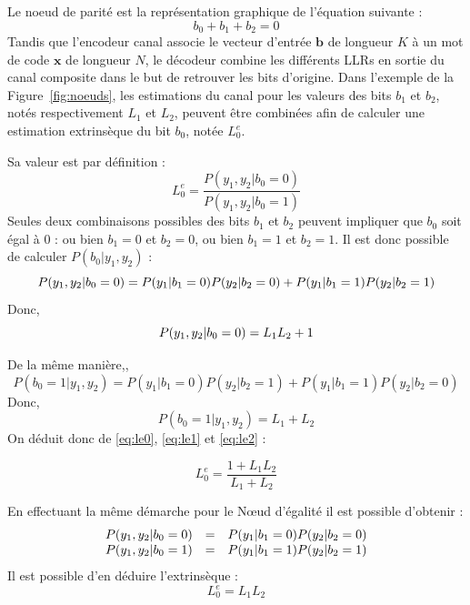 Le noeud de parité est la représentation graphique de l'équation suivante : 
\begin{equation}
b_0 + b_1 + b_2 = 0
\end{equation}
Tandis que l'encodeur canal associe le vecteur d'entrée $\mathbold{b}$ de longueur $K$ à un mot de code $\mathbold{x}$ de longueur $N$, le décodeur combine les différents LLRs en sortie du canal composite dans le but de retrouver les bits d'origine.
Dans l'exemple de la Figure~\ref{fig:noeuds}, les estimations du canal pour les valeurs des bits $b_1$ et $b_2$, notés respectivement $L_1$ et $L_2$, peuvent être combinées afin de calculer une estimation extrinsèque du bit $b_0$, notée $L_0^e$.

Sa valeur est par définition :
\begin{equation}
L^e_0 = \dfrac{P(y_1,y_2 | b_0 = 0)}{P(y_1,y_2 | b_0 = 1)}
\label{eq:le0}
\end{equation}
Seules deux combinaisons possibles des bits $b_1$ et $b_2$ peuvent impliquer que $b_0$ soit égal à $0$ : ou bien $b_1=0$ et $b_2=0$, ou bien $b_1=1$ et $b_2=1$. Il est donc possible de calculer $P(b_0|y_1,y_2)$ : 
\begin{equation}
P(y_1,y_2 | b_0 = 0)  =  P(y_1 | b_1 = 0)P(y_2 | b_2 = 0) + P(y_1 | b_1 = 1)P(y_2 | b_2 = 1) \\
\end{equation}
Donc,  
\begin{equation}
P(y_1,y_2 | b_0 = 0)  =  L_1L_2 + 1 \\
\label{eq:le1}
\end{equation}


De la même manière,,
\begin{equation}
P(b_0 = 1 | y_1,y_2) =P(y_1 | b_1 = 0)P(y_2 | b_2 = 1) + P(y_1 | b_1 = 1)P(y_2 | b_2 = 0)
\end{equation}
Donc, 
\begin{equation}
P(b_0 = 1 | y_1,y_2) = L_1 + L_2
\label{eq:le2}
\end{equation}
On déduit donc de \ref{eq:le0}, \ref{eq:le1} et \ref{eq:le2} : 

\begin{equation}
L^e_0=\dfrac{1 + L_1L_2}{L_1+L_2}
\label{eq:parity}
\end{equation}

En effectuant la même démarche pour le N\oe{}ud d'égalité il est possible d'obtenir :
\begin{eqnarray*}
\begin{array}{r c l}
P(y_1,y_2|b_0=0) & = & P(y_1|b_1=0) P(y_2 | b_2 = 0) \\
P(y_1,y_2|b_0=1) & = & P(y_1|b_1=1) P(y_2 | b_2 = 1) 
\end{array}
\end{eqnarray*}
Il est possible d'en déduire l'extrinsèque :
\begin{equation}
L^e_0=L_1L_2
\label{eq:equality}
\end{equation}

